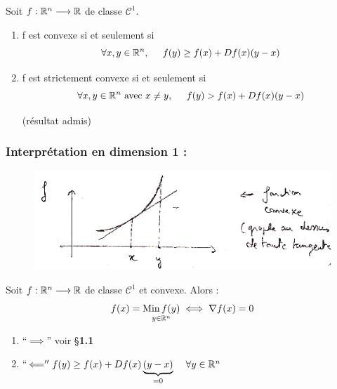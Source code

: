 \begin{lemme}
    Soit $f : \mathbb{R}^n \longrightarrow \mathbb{R}$ de classe $\mathcal{C}^1$.
    \begin{enumerate}[label=•]
        \item f est convexe si et seulement si 
            \[
                \forall x,y \in \mathbb{R}^n, \hspace{0.5cm} f(y) \geq f(x) + Df(x)(y-x)
            \]
        \item f est strictement convexe si et seulement si
            \[
                \forall x,y \in \mathbb{R}^n \text{ avec } x \ne y, \hspace{0.5cm} f(y) > f(x) + Df(x)(y-x)
            \]

            (résultat admis)
    \end{enumerate}
\end{lemme}

\vspace{0.1cm}
\subsubsection*{Interprétation en dimension 1 :}
\vspace{0.7cm}

\begin{figure}[h]
    \centering
    \includegraphics[scale=0.7]{7optim-cvx-tang.png}
    \label{fig:7optim-cvx-tang}
\end{figure}

\begin{ftheo}
    Soit $f : \mathbb{R}^n \longrightarrow \mathbb{R}$ de classe $\mathcal{C}^1$ et convexe. Alors :
    \[
        f(x) = \underset{y \in \mathbb{R}^n}{\operatorname{Min} f(y)} \iff \nabla f(x) = 0
    \]
\end{ftheo}

\begin{preuve}
    \begin{enumerate}[label=•]
        \item ``$\implies$'' voir \S \textbf{1.1}
        \item ``$\Longleftarrow'' f(y) \geq f(x) + Df(x)\underbrace{(y-x)}_{= 0} \hspace{0.4cm} \forall y \in \mathbb{R}^n$
    \end{enumerate}
\end{preuve}

